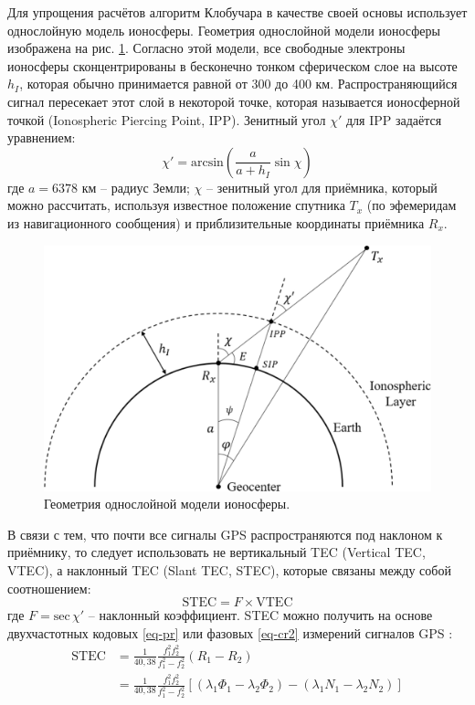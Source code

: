 Для упрощения расчётов алгоритм Клобучара в качестве своей основы использует однослойную модель ионосферы.
Геометрия однослойной модели ионосферы изображена на рис. \ref{fig-slm}.
Согласно этой модели, все свободные электроны ионосферы сконцентрированы в бесконечно тонком сферическом слое на высоте $h_I$, которая обычно принимается равной от 300 до 400 км. 
Распространяющийся сигнал пересекает этот слой в некоторой точке, которая называется ионосферной точкой (Ionospheric Piercing Point, IPP). 
Зенитный угол $\chi'$ для IPP задаётся уравнением:
\begin{equation}
\chi'=\text{arcsin}\left(\frac{a}{a+h_I}\sin\chi\right)    
\label{eq-zenith-angle}
\end{equation}
где 
$a=6378$ км -- радиус Земли;
$\chi$ -- зенитный угол для приёмника, который можно рассчитать, используя известное положение спутника $T_x$ (по эфемеридам из навигационного сообщения) и приблизительные координаты приёмника $R_x$.
\vspace{1em}
\begin{figure}[h]
\centering    
\includegraphics[width=0.7\linewidth]{fig/slm.png}    
\caption{Геометрия однослойной модели ионосферы.}
\label{fig-slm}      
\end{figure}

В связи с тем, что почти все сигналы GPS распространяются под наклоном к приёмнику, то следует использовать не вертикальный TEC (Vertical TEC, VTEC), а наклонный TEC (Slant TEC, STEC), которые связаны между собой соотношением:
\begin{equation}
\text{STEC}=F\times\text{VTEC}
\label{eq-stec}
\end{equation}
где
$F=\text{sec}\,\chi'$ -- наклонный коэффициент.
STEC можно получить на основе двухчастотных кодовых \eqref{eq-pr} или фазовых \eqref{eq-cr2} измерений сигналов GPS \cite{Hofmann2008}:
\begin{equation}
\begin{aligned}
\text{STEC}&=\frac{1}{40,38}\frac{f_1^2f_2^2}{f_1^2-f_2^2}(R_1-R_2) \\
&=\frac{1}{40,38}\frac{f_1^2f_2^2}{f_1^2-f_2^2}\left[(\lambda_1\Phi_1-\lambda_2\Phi_2)-(\lambda_1N_1-\lambda_2N_2)\right] 
\end{aligned}
\end{equation}

